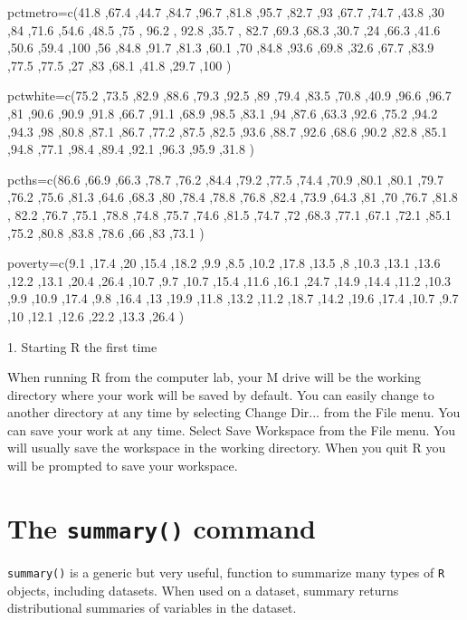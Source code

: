 \documentclass[a4paper,12pt]{article}
\begin{document}
pctmetro=c(41.8 ,67.4 ,44.7 ,84.7 ,96.7 ,81.8 ,95.7 ,82.7 ,93 ,67.7 ,74.7 ,43.8 ,30 ,84 ,71.6 ,54.6 ,48.5 ,75 , 96.2 , 92.8 ,35.7 ,
82.7 ,69.3 ,68.3 ,30.7 ,24 ,66.3 ,41.6 ,50.6 ,59.4 ,100 ,56 ,84.8 ,91.7 ,81.3 ,60.1 ,70 ,84.8 ,93.6 ,69.8 ,32.6 ,67.7 ,83.9 ,77.5 ,77.5 ,27 ,83 ,68.1 ,41.8 ,29.7 ,100 )

pctwhite=c(75.2 ,73.5 ,82.9 ,88.6 ,79.3 ,92.5 ,89 ,79.4 ,83.5 ,70.8 ,40.9 ,96.6 ,96.7 ,81 ,90.6 ,90.9 ,91.8 ,66.7 ,91.1 ,68.9 ,98.5 ,83.1 ,94 ,87.6 ,63.3 ,92.6 ,75.2 ,94.2 ,94.3 ,98 ,80.8 ,87.1 ,86.7 ,77.2 ,87.5 ,82.5 ,93.6 ,88.7 ,92.6 ,68.6 ,90.2 ,82.8 ,85.1 ,94.8 ,77.1 ,98.4 ,89.4 ,92.1 ,96.3 ,95.9 ,31.8 )

pcths=c(86.6 ,66.9 ,66.3 ,78.7 ,76.2 ,84.4 ,79.2 ,77.5 ,74.4 ,70.9 ,80.1 ,80.1 ,79.7 ,76.2 ,75.6 ,81.3 ,64.6 ,68.3 ,80 ,78.4 ,78.8 ,76.8 ,82.4 ,73.9 ,64.3 ,81 ,70 ,76.7 ,81.8 , 82.2 ,76.7 ,75.1 ,78.8 ,74.8 ,75.7 ,74.6 ,81.5 ,74.7 ,72 ,68.3 ,77.1 ,67.1 ,72.1 ,85.1 ,75.2 ,80.8 ,83.8 ,78.6 ,66 ,83 ,73.1 )

poverty=c(9.1 ,17.4 ,20 ,15.4 ,18.2 ,9.9 ,8.5 ,10.2 ,17.8 ,13.5 ,8 ,10.3 ,13.1 ,13.6 ,12.2 ,13.1 ,20.4 ,26.4 ,10.7 ,9.7 ,10.7 ,15.4 ,11.6 ,16.1 ,24.7 ,14.9 ,14.4 ,11.2 ,10.3 ,9.9 ,10.9 ,17.4 ,9.8 ,16.4 ,13 ,19.9 ,11.8 ,13.2 ,11.2 ,18.7 ,14.2 ,19.6 ,17.4 ,10.7 ,9.7 ,10 ,12.1 ,12.6 ,22.2 ,13.3 ,26.4 )




\newpage




1. Starting R the first time


When running R from the computer lab, your M drive will be the working directory where your work will be saved by default. You can easily change to another directory at any time by selecting Change Dir... from the File menu. 
You can save your work at any time. Select Save Workspace from the File menu. You will usually save the workspace in the working directory. When you quit R you will be prompted to save your workspace. 


\section{The \texttt{summary()} command}
\texttt{summary()} is a generic but very useful, function to summarize many types of \texttt{R} objects, including datasets. When used on a dataset, summary returns distributional summaries of variables in the dataset.
\end{document}
